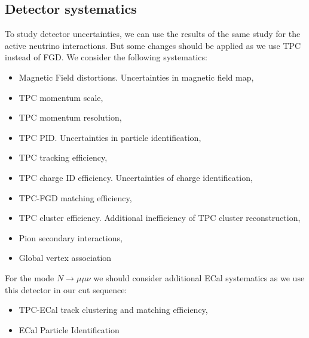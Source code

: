 \documentclass[../main.tex]{subfiles}
\begin{document}
\subsection{Detector systematics}
To study detector uncertainties, we can use the results of the same study for the active neutrino interactions. But some changes should be applied as we use TPC instead of FGD. We consider the following systematics:
\begin{itemize}
    \item Magnetic Field distortions. Uncertainties in magnetic field map,
    \item TPC momentum scale,
    \item TPC momentum resolution,
    \item TPC PID. Uncertainties in particle identification,
    \item TPC tracking efficiency,
    \item TPC charge ID efficiency. Uncertainties of charge identification,
    \item TPC-FGD matching efficiency,
    \item TPC cluster efficiency. Additional inefficiency of TPC cluster reconstruction,
    \item Pion secondary interactions,
    \item Global vertex association
\end{itemize}

For the mode $N\to\mu\mu\nu$ we should consider additional ECal systematics as we use this detector in our cut sequence:

\begin{itemize}
    \item TPC-ECal track clustering and matching efficiency,
    \item ECal Particle Identification
\end{itemize}
\end{document}
